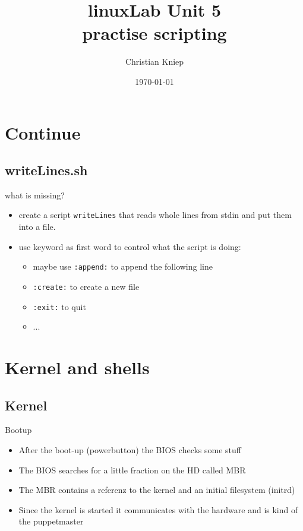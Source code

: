 \documentclass[handout]{beamer}
\author{Christian Kniep}
\newcommand{\code}[1]{\colorbox{lGray}{\texttt{#1}}}
\begin{document}
\title{linuxLab Unit 5 \\ practise scripting}  
\date[\today]{\today} 

\begin{frame}
	\titlepage
\end{frame} 


\section{Continue}
    \subsection{writeLines.sh}
        \begin{frame}{what is missing?}
			\begin{itemize}
				\item<1-> create a script \code{writeLines} that reads whole lines from stdin and put them into a file.
                \item<2-> use keyword as first word to control what the script is doing:
                \begin{itemize}
                    \item<2-> maybe use \code{:append:} to append the following line
                    \item<2-> \code{:create:} to create a new file
                    \item<2-> \code{:exit:} to quit
                    \item<2-> ...
                \end{itemize}
            \end{itemize}
		\end{frame}
\section{Kernel and shells}
    \subsection{Kernel}
        \begin{frame}{Bootup}
            \begin{itemize}
                \item<1-> After the boot-up (powerbutton) the BIOS checks some stuff
                \item<2-> The BIOS searches for a little fraction on the HD called MBR
                \item<3-> The MBR contains a referenz to the kernel and an initial filesystem (initrd)
                \item<4-> Since the kernel is started it communicates with the hardware and is kind of the puppetmaster
            \end{itemize}
        \end{frame}
\end{document}
